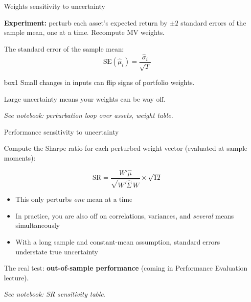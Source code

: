 \documentclass[aspectratio=169,10pt]{beamer}
\begin{document}

\begin{frame}{Weights sensitivity to uncertainty}

\textbf{Experiment:} perturb each asset's expected return by $\pm 2$ standard errors of the sample mean, one at a time. Recompute MV weights.

\vskip 10pt

The standard error of the sample mean:
$$\text{SE}(\hat{\mu}_i) = \frac{\hat{\sigma}_i}{\sqrt{T}}$$

\vskip 10pt

\begin{beamercolorbox}[rounded=true,sep=8pt]{box1}
Small changes in inputs can flip signs of portfolio weights.

Large uncertainty means your weights can be way off.
\end{beamercolorbox}

\vskip 10pt

\textit{See notebook: perturbation loop over assets, weight table.}

\end{frame}


\begin{frame}{Performance sensitivity to uncertainty}

Compute the Sharpe ratio for each perturbed weight vector (evaluated at sample moments):

\vskip 8pt

$$\text{SR} = \frac{W' \hat{\mu}}{\sqrt{W' \hat{\Sigma} \, W}} \times \sqrt{12}$$

\vskip 10pt

\begin{itemize}
\item This only perturbs \textit{one} mean at a time
\item In practice, you are also off on correlations, variances, and \textit{several} means simultaneously
\item With a long sample and constant-mean assumption, standard errors understate true uncertainty
\end{itemize}

\vskip 10pt

The real test: \textbf{out-of-sample performance} (coming in Performance Evaluation lecture).

\vskip 5pt

\textit{See notebook: SR sensitivity table.}

\end{frame}
\end{document}
